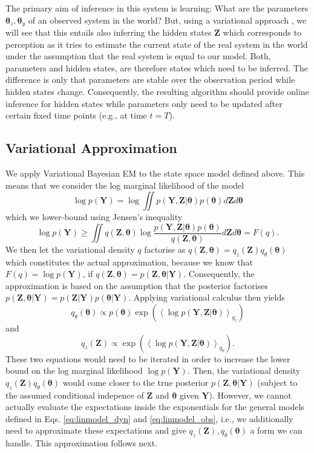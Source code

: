 \documentclass[a4paper,10pt]{article}
\newcommand{\bs}[1]{\mathbf{#1}}					%
\newcommand{\bgs}[1]{\boldsymbol{#1}}				%
\newcommand{\eq}[1]{\begin{equation} #1 \end{equation}}%
\renewcommand{\ss}{z}         %
\newcommand{\so}{y}         %
\renewcommand{\sp}{\theta}    %
\newcommand{\pp}{\bgs{\sp}} %
\newcommand{\Ps}{\bs{Z}}    %
\newcommand{\Po}{\bs{Y}}    %
\newcommand{\E}[2][]{\left\langle #2 \right\rangle_{#1}}	%
\begin{document}
The primary aim of inference in this system is learning: What are the parameters $\pp_{\ss}, \pp_{\so}$ of an observed system in the world? But, using a variational approach \cite{Beal2003}, we will see that this entails also inferring the hidden states $\Ps$ which corresponds to perception as it tries to estimate the current state of the real system in the world under the assumption that the real system is equal to our model. Both, parameters and hidden states, are therefore states which need to be inferred. The difference is only that parameters are stable over the observation period while hidden states change. Consequently, the resulting algorithm should provide online inference for hidden states while parameters only need to be updated after certain fixed time points (e.g., at time $t=T$).


\subsection{Variational Approximation}
We apply Variational Bayesian EM \cite{Beal2003} to the state space model defined above. This means that we consider the log marginal likelihood of the model
\eq{
    \log p(\Po) = \log \iint p(\Po,\Ps|\pp)p(\pp) d\Ps d\pp
}
which we lower-bound using Jensen's inequality
\eq{
    \log p(\Po) \geq \iint q(\Ps, \pp)\log \frac{p(\Po,\Ps|\pp)p(\pp)}{q(\Ps, \pp)} d\Ps d\pp = F(q).
}
We then let the variational density $q$ factorise as $q(\Ps, \pp) = q_{\ss}(\Ps)q_{\sp}(\pp)$ which constitutes the actual approximation, because we know that $F(q) = \log p(\Po)$, if $q(\Ps, \pp) = p(\Ps,\pp|\Po)$. Consequently, the approximation is based on the assumption that the posterior factorises $p(\Ps,\pp|\Po) = p(\Ps|\Po) p(\pp|\Po)$. Applying variational calculus then yields
\eq{\label{eq:vardensupdate_params}
    q_{\sp}(\pp) \propto p(\pp)\exp\left(\E[q_\ss]{\log p(\Po,\Ps|\pp)}\right)
}
and
\eq{\label{eq:vardensupdate_states}
    q_{\ss}(\Ps) \propto \exp\left(\E[q_\sp]{\log p(\Po,\Ps|\pp)}\right).
}
These two equations would need to be iterated in order to increase the lower bound on the log marginal likelihood $\log p(\Po)$. Then, the variational density $q_{\ss}(\Ps)q_{\sp}(\pp)$ would come closer to the true posterior $p(\Ps,\pp|\Po)$ (subject to the assumed conditional indepence of $\Ps$ and $\pp$ given $\Po$). However, we cannot actually evaluate the expectations inside the exponentials for the general models defined in Eqs. \ref{eq:linmodel_dyn} and \ref{eq:linmodel_obs}, i.e., we additionally need to approximate these expectations and give $q_{\ss}(\Ps), q_{\sp}(\pp)$ a form we can handle. This approximation follows next.
\end{document}

